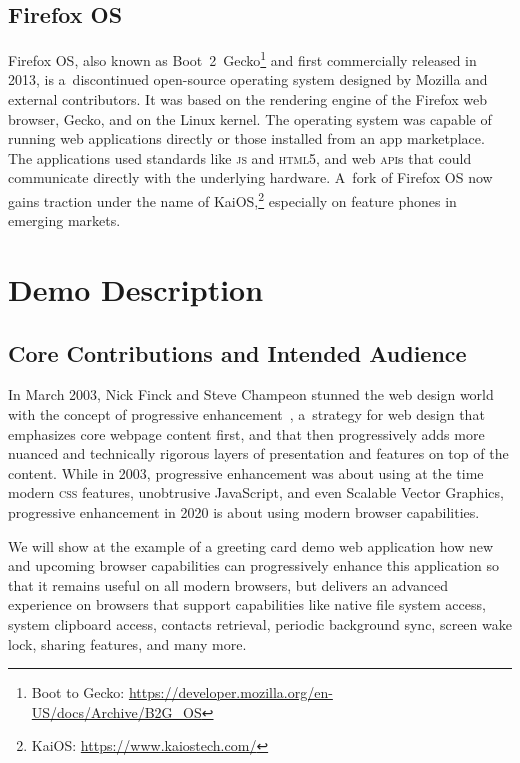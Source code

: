 \documentclass[sigconf]{acmart}
\begin{document}
\subsection{Firefox \textsc{OS}}

Firefox \textsc{OS}, also known as
Boot~2~Gecko\footnote{Boot to Gecko: \url{https://developer.mozilla.org/en-US/docs/Archive/B2G_OS}}
and first commercially released in 2013,
is a~discontinued open-source operating system
designed by Mozilla and external contributors.
It was based on the rendering engine of the Firefox web browser, Gecko,
and on the Linux kernel.
The operating system was capable of running web applications directly
or those installed from an app marketplace.
The applications used standards like \textsc{js} and \textsc{html}5,
and web \textsc{api}s that could communicate directly with the underlying hardware.
A~fork of Firefox \textsc{OS} now gains traction under the name of
Kai\textsc{OS},\footnote{Kai\textsc{OS}: \url{https://www.kaiostech.com/}}
especially on feature phones in emerging markets.

\section{Demo Description}

\subsection{Core Contributions and Intended Audience}

In March 2003, Nick Finck and Steve Champeon stunned the web design world
with the concept of progressive enhancement~\cite{champeon03},
a~strategy for web design that emphasizes core webpage content first,
and that then progressively adds more nuanced and technically rigorous layers
of presentation and features on top of the content.
While in 2003, progressive enhancement was about using at the time modern \textsc{css} features,
unobtrusive JavaScript, and even Scalable Vector Graphics,
progressive enhancement in 2020 is about using modern browser capabilities.

We will show at the example of a greeting card demo web application
how new and upcoming browser capabilities can progressively enhance
this application so that it remains useful on all modern browsers,
but delivers an advanced experience on browsers that support capabilities
like native file system access, system clipboard access, contacts retrieval,
periodic background sync, screen wake lock, sharing features, and many more.
\end{document}
